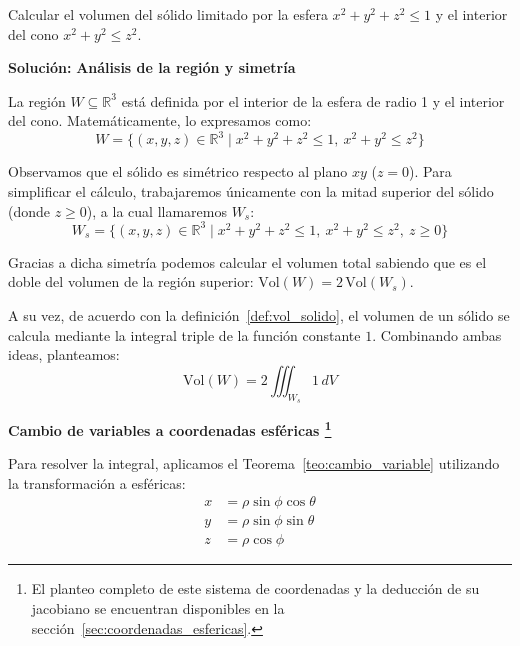 
\vspace{0.5 cm}
\begin{example} Calcular el volumen del sólido limitado por la esfera $x^2 + y^2 + z^2 \leq 1$ y el interior del cono $x^2 + y^2 \leq z^2$.
\end{example}

\vspace{0.3cm}
\textbf{Soluci\'on:}
\bigskip
\textbf{Análisis de la región y simetría}

La región $W \subseteq \mathbb{R}^3$ está definida por el interior de la esfera de radio 1 y el interior del cono. Matemáticamente, lo expresamos como:
\[
    W = \{ (x,y,z) \in \mathbb{R}^3 \mid x^2 + y^2 + z^2 \leq 1, \ x^2 + y^2 \leq z^2 \}
\]

\begin{figure}[htbp]
    \centering
     
    \label{fig:Ejemplo 8.2.5}
\end{figure}

Observamos que el sólido es simétrico respecto al plano $xy$ ($z=0$). Para simplificar el cálculo, trabajaremos únicamente con la mitad superior del sólido (donde $z \geq 0$), a la cual llamaremos $W_s$:
\[
    W_s = \{ (x,y,z) \in \mathbb{R}^3 \mid x^2 + y^2 + z^2 \leq 1, \ x^2 + y^2 \leq z^2, \ z \geq 0 \}
\]

Gracias a dicha simetría podemos calcular el volumen total sabiendo que es el doble del volumen de la región superior: $\text{Vol}(W) = 2 \, \text{Vol}(W_s)$. 

A su vez, de acuerdo con la definición~\ref{def:vol_solido}, el volumen de un sólido se calcula mediante la integral triple de la función constante $1$. Combinando ambas ideas, planteamos:
\[
    \text{Vol}(W) = 2 \iiint_{W_s} 1 \, dV
\]

\textbf{Cambio de variables a coordenadas esféricas \footnote{El planteo completo de este sistema de coordenadas y la deducción de su jacobiano se encuentran disponibles en la sección~\ref{sec:coordenadas_esfericas}.}}  

Para resolver la integral, aplicamos el Teorema~\ref{teo:cambio_variable} utilizando la transformación a esféricas:
\begin{align*}
    x &= \rho \sin \phi \cos \theta \\
    y &= \rho \sin \phi \sin \theta \\
    z &= \rho \cos \phi
\end{align*}

